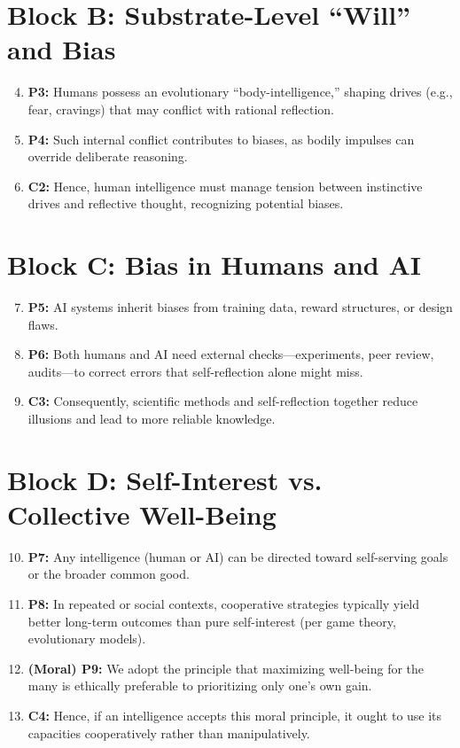 \section*{Block B: Substrate-Level “Will” and Bias}
\begin{enumerate}
    \setcounter{enumi}{3} %
    \item \textbf{P3:} Humans possess an evolutionary “body-intelligence,” shaping drives (e.g., fear, cravings) that may conflict with rational reflection.
    \item \textbf{P4:} Such internal conflict contributes to biases, as bodily impulses can override deliberate reasoning.
    \item \textbf{C2:} Hence, human intelligence must manage tension between instinctive drives and reflective thought, recognizing potential biases.
\end{enumerate}

\section*{Block C: Bias in Humans and AI}
\begin{enumerate}
    \setcounter{enumi}{6}
    \item \textbf{P5:} AI systems inherit biases from training data, reward structures, or design flaws.
    \item \textbf{P6:} Both humans and AI need external checks—experiments, peer review, audits—to correct errors that self-reflection alone might miss.
    \item \textbf{C3:} Consequently, scientific methods and self-reflection together reduce illusions and lead to more reliable knowledge.
\end{enumerate}

\section*{Block D: Self-Interest vs. Collective Well-Being}
\begin{enumerate}
    \setcounter{enumi}{9}
    \item \textbf{P7:} Any intelligence (human or AI) can be directed toward self-serving goals or the broader common good.
    \item \textbf{P8:} In repeated or social contexts, cooperative strategies typically yield better long-term outcomes than pure self-interest (per game theory, evolutionary models).
    \item \textbf{(Moral) P9:} We adopt the principle that maximizing well-being for the many is ethically preferable to prioritizing only one’s own gain.
    \item \textbf{C4:} Hence, if an intelligence accepts this moral principle, it ought to use its capacities cooperatively rather than manipulatively.
\end{enumerate}

